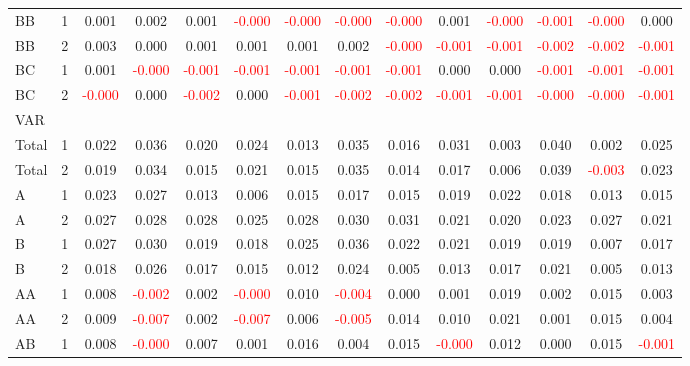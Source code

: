 \begin{table}[!htb]
{\begin{tabular}{llcccccccccccc}
BB & 1 & 0.001 & 0.002 & 0.001 & \textcolor{red}{-0.000} & \textcolor{red}{-0.000} & \textcolor{red}{-0.000} & \textcolor{red}{-0.000} & 0.001 & \textcolor{red}{-0.000} & \textcolor{red}{-0.001} & \textcolor{red}{-0.000} & 0.000\\
BB & 2 & 0.003 & 0.000 & 0.001 & 0.001 & 0.001 & 0.002 & \textcolor{red}{-0.000} & \textcolor{red}{-0.001} & \textcolor{red}{-0.001} & \textcolor{red}{-0.002} & \textcolor{red}{-0.002} & \textcolor{red}{-0.001}\\
BC & 1 & 0.001 & \textcolor{red}{-0.000} & \textcolor{red}{-0.001} & \textcolor{red}{-0.001} & \textcolor{red}{-0.001} & \textcolor{red}{-0.001} & \textcolor{red}{-0.001} & 0.000 & 0.000 & \textcolor{red}{-0.001} & \textcolor{red}{-0.001} & \textcolor{red}{-0.001}\\
BC & 2 & \textcolor{red}{-0.000} & 0.000 & \textcolor{red}{-0.002} & 0.000 & \textcolor{red}{-0.001} & \textcolor{red}{-0.002} & \textcolor{red}{-0.002} & \textcolor{red}{-0.001} & \textcolor{red}{-0.001} & \textcolor{red}{-0.000} & \textcolor{red}{-0.000} & \textcolor{red}{-0.001}\\
\hline
VAR &  &  &  &  &  &  &  &  &  &  &  &  & \\
\hline
Total & 1 & 0.022 & 0.036 & 0.020 & 0.024 & 0.013 & 0.035 & 0.016 & 0.031 & 0.003 & 0.040 & 0.002 & 0.025\\
Total & 2 & 0.019 & 0.034 & 0.015 & 0.021 & 0.015 & 0.035 & 0.014 & 0.017 & 0.006 & 0.039 & \textcolor{red}{-0.003} & 0.023\\
A & 1 & 0.023 & 0.027 & 0.013 & 0.006 & 0.015 & 0.017 & 0.015 & 0.019 & 0.022 & 0.018 & 0.013 & 0.015\\
A & 2 & 0.027 & 0.028 & 0.028 & 0.025 & 0.028 & 0.030 & 0.031 & 0.021 & 0.020 & 0.023 & 0.027 & 0.021\\
B & 1 & 0.027 & 0.030 & 0.019 & 0.018 & 0.025 & 0.036 & 0.022 & 0.021 & 0.019 & 0.019 & 0.007 & 0.017\\
B & 2 & 0.018 & 0.026 & 0.017 & 0.015 & 0.012 & 0.024 & 0.005 & 0.013 & 0.017 & 0.021 & 0.005 & 0.013\\
AA & 1 & 0.008 & \textcolor{red}{-0.002} & 0.002 & \textcolor{red}{-0.000} & 0.010 & \textcolor{red}{-0.004} & 0.000 & 0.001 & 0.019 & 0.002 & 0.015 & 0.003\\
AA & 2 & 0.009 & \textcolor{red}{-0.007} & 0.002 & \textcolor{red}{-0.007} & 0.006 & \textcolor{red}{-0.005} & 0.014 & 0.010 & 0.021 & 0.001 & 0.015 & 0.004\\
AB & 1 & 0.008 & \textcolor{red}{-0.000} & 0.007 & 0.001 & 0.016 & 0.004 & 0.015 & \textcolor{red}{-0.000} & 0.012 & 0.000 & 0.015 & \textcolor{red}{-0.001}\\

\end{tabular}}
\end{table}

